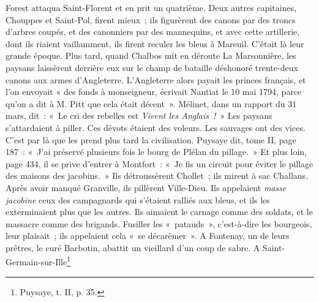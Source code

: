 \documentclass[french,twoside]{book} %
\begin{document}
Forest attaqua Saint-Florent et en prit un quatrième. Deux autres capitaines, Chouppes et Saint-Pol, firent mieux ; ils figurèrent des canons par des troncs d’arbres coupés, et des canonniers par des mannequins, et avec cette artillerie, dont ils riaient vaillamment, ils firent reculer les bleus à Mareuil. C’était là leur grande époque. Plus tard, quand Chalbos mit en déroute La Marsonnière, les paysans laissèrent derrière eux sur le champ de bataille déshonoré trente-deux canons aux armes d’Angleterre. L’Angleterre alors payait les princes français, et l’on envoyait « des fonds à monseigneur, écrivait Nantiat le 10 mai 1794, parce qu’on a dit à M. Pitt que cela était décent ». Mélinet, dans un rapport du 31 mars, dit : « Le cri des rebelles est \emph{Vivent les Anglais !} » Les paysans s’attardaient à piller. Ces dévots étaient des voleurs. Les sauvages ont des vices. C’est par là que les prend plus tard la civilisation. Puysaye dit, tome II, page 187 : « J’ai préservé plusieurs fois le bourg de Plélan du pillage. » Et plus loin, page 434, il se prive d’entrer à Montfort :  « Je fis un circuit pour éviter le pillage des maisons des jacobins. » Ils détroussèrent Chollet ; ils mirent à sac Challans. Après avoir manqué Granville, ils pillèrent Ville-Dieu. Ils appelaient \emph{masse jacobine} ceux des campagnards qui s’étaient ralliés aux bleus, et ils les exterminaient plus que les autres. Ils aimaient le carnage comme des soldats, et le massacre comme des brigands. Fusiller les « patauds », c’est-à-dire les bourgeois, leur plaisait ; ils appelaient cela « se décarêmer ». A Fontenay, un de leurs prêtres, le curé Barbotin, abattit un vieillard d’un coup de sabre. A Saint-Germain-sur-Ille\footnote{ \noindent Puysaye, t. II, p. 35.
}
\end{document}
